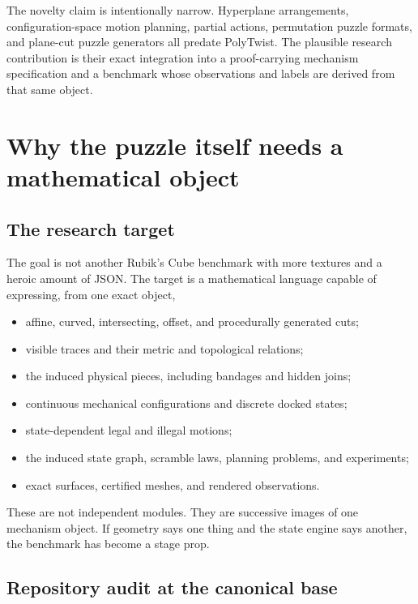 \documentclass[11pt,openany]{book}
\theoremstyle{polyplain}
\theoremstyle{polydef}
\begin{document}
The novelty claim is intentionally narrow. Hyperplane arrangements, configuration-space motion planning, partial actions, permutation puzzle formats, and plane-cut puzzle generators all predate PolyTwist. The plausible research contribution is their exact integration into a proof-carrying mechanism specification and a benchmark whose observations and labels are derived from that same object.

\tableofcontents

\mainmatter

\chapter{Why the puzzle itself needs a mathematical object}
\label{chap:motivation}

\section{The research target}

The goal is not another Rubik's Cube benchmark with more textures and a heroic amount of JSON. The target is a mathematical language capable of expressing, from one exact object,
\begin{itemize}
  \item affine, curved, intersecting, offset, and procedurally generated cuts;
  \item visible traces and their metric and topological relations;
  \item the induced physical pieces, including bandages and hidden joins;
  \item continuous mechanical configurations and discrete docked states;
  \item state-dependent legal and illegal motions;
  \item the induced state graph, scramble laws, planning problems, and experiments;
  \item exact surfaces, certified meshes, and rendered observations.
\end{itemize}

These are not independent modules. They are successive images of one mechanism object. If geometry says one thing and the state engine says another, the benchmark has become a stage prop.

\section{Repository audit at the canonical base}
\label{sec:repository-audit}
\end{document}
